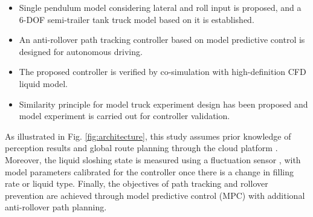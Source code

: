 \begin{itemize}
    \item Single pendulum model considering lateral and roll input is proposed, and a 6-DOF semi-trailer tank truck model based on it is established.
    \item An anti-rollover path tracking controller based on model predictive control is designed for autonomous driving.
    \item The proposed controller is verified by co-simulation with high-definition CFD liquid model. 
    \item Similarity principle for model truck experiment design has been proposed and model experiment is carried out for controller validation.
\end{itemize}

As illustrated in Fig. \ref{fig:architecture}, this study assumes prior knowledge of perception results and global route planning through the cloud platform \cite{CloudSysLeqiangLi}. Moreover, the liquid sloshing state is measured using a fluctuation sensor \cite{KomasaMutiDOF}, with model parameters calibrated for the controller once there is a change in filling rate or liquid type. Finally, the objectives of path tracking and rollover prevention are achieved through model predictive control (MPC) with additional anti-rollover path planning.


